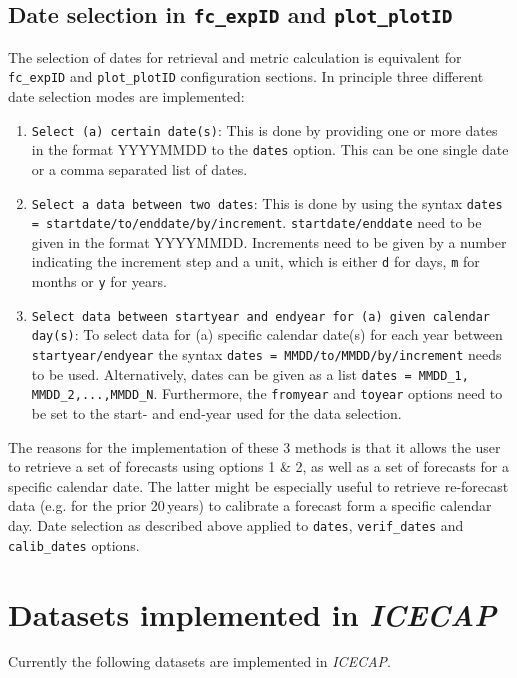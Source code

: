\documentclass[DIV=10, parskip=full]{scrreprt}
\newcommand{\ice}{\textit{ICECAP}\xspace}
\newcommand{\notimplement}[1]{#1}
\begin{document}
\section{Date selection in \texttt{fc\_expID} and \texttt{plot\_plotID}}\label{sec:dates}
The selection of dates for retrieval and metric calculation is equivalent for  \texttt{fc\_expID} and \texttt{plot\_plotID} configuration sections. In principle three different date selection modes are implemented:
\begin{enumerate}
	\item \texttt{Select (a) certain date(s)}: This is done by providing one or more dates in the format YYYYMMDD to the \texttt{dates} option. This can be one single date or a comma separated list of dates.
	\item \texttt{Select a data between two dates}: This is done by using the syntax \texttt{dates = startdate/to/enddate/by/increment}. \texttt{startdate/enddate} need to be given in the format YYYYMMDD. Increments need to be given by a number indicating the increment step and a unit, which is either \texttt{d} for days, \texttt{m} for months or \texttt{y} for years.
	\item \texttt{Select data between startyear and endyear for (a) given calendar day(s)}: To select data for (a) specific calendar date(s) for each year between \texttt{startyear/endyear} the syntax \texttt{dates = MMDD/to/MMDD/by/increment} needs to be used. Alternatively, dates can be given as a list \texttt{dates = MMDD\_1, MMDD\_2,...,MMDD\_N}.  Furthermore, the \texttt{fromyear} and \texttt{toyear} options need to be set to the start- and end-year used for the data selection.  
\end{enumerate}

The reasons for the implementation of these 3 methods is that it allows the user to retrieve a set of forecasts using options 1 \& 2, as well as a set of forecasts for a specific calendar date. The latter might be especially useful to retrieve re-forecast data (e.g. for the prior 20\,years) to calibrate a forecast form a specific calendar day. Date selection as described above applied to   \texttt{dates}, \texttt{verif\_dates} and  \texttt{calib\_dates} options.


\chapter{Datasets implemented in \ice} \label{chap:data}
\notimplement{Currently} the following datasets are implemented in \ice.
\end{document}
